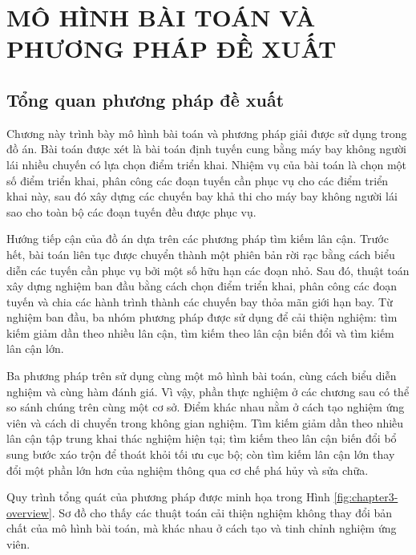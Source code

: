 \chapter{MÔ HÌNH BÀI TOÁN VÀ PHƯƠNG PHÁP ĐỀ XUẤT}
\label{chap:mo-hinh-va-phuong-phap}

\section{Tổng quan phương pháp đề xuất}

Chương này trình bày mô hình bài toán và phương pháp giải được sử dụng trong đồ án. Bài toán được xét là bài toán định tuyến cung bằng máy bay không người lái nhiều chuyến có lựa chọn điểm triển khai. Nhiệm vụ của bài toán là chọn một số điểm triển khai, phân công các đoạn tuyến cần phục vụ cho các điểm triển khai này, sau đó xây dựng các chuyến bay khả thi cho máy bay không người lái sao cho toàn bộ các đoạn tuyến đều được phục vụ.

Hướng tiếp cận của đồ án dựa trên các phương pháp tìm kiếm lân cận. Trước hết, bài toán liên tục được chuyển thành một phiên bản rời rạc bằng cách biểu diễn các tuyến cần phục vụ bởi một số hữu hạn các đoạn nhỏ. Sau đó, thuật toán xây dựng nghiệm ban đầu bằng cách chọn điểm triển khai, phân công các đoạn tuyến và chia các hành trình thành các chuyến bay thỏa mãn giới hạn bay. Từ nghiệm ban đầu, ba nhóm phương pháp được sử dụng để cải thiện nghiệm: tìm kiếm giảm dần theo nhiều lân cận, tìm kiếm theo lân cận biến đổi và tìm kiếm lân cận lớn.

Ba phương pháp trên sử dụng cùng một mô hình bài toán, cùng cách biểu diễn nghiệm và cùng hàm đánh giá. Vì vậy, phần thực nghiệm ở các chương sau có thể so sánh chúng trên cùng một cơ sở. Điểm khác nhau nằm ở cách tạo nghiệm ứng viên và cách di chuyển trong không gian nghiệm. Tìm kiếm giảm dần theo nhiều lân cận tập trung khai thác nghiệm hiện tại; tìm kiếm theo lân cận biến đổi bổ sung bước xáo trộn để thoát khỏi tối ưu cục bộ; còn tìm kiếm lân cận lớn thay đổi một phần lớn hơn của nghiệm thông qua cơ chế phá hủy và sửa chữa.

Quy trình tổng quát của phương pháp được minh họa trong Hình \ref{fig:chapter3-overview}. Sơ đồ cho thấy các thuật toán cải thiện nghiệm không thay đổi bản chất của mô hình bài toán, mà khác nhau ở cách tạo và tinh chỉnh nghiệm ứng viên.

